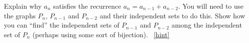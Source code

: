\documentclass{book}
\begin{document}
\setcounter{project}{133}
\addtocounter{project}{-1}
\begin{activity}[]\label{activity-126}
\hypertarget{p-929}{}%
Explain why \(a_n\) satisfies the recurrence \(a_n = a_{n-1} + a_{n-2}\).  You will need to use the graphs \(P_n\), \(P_{n-1}\) and \(P_{n-2}\) and their independent sets to do this.  Show how you can ``find'' the independent sets of \(P_{n-1}\) and \(P_{n-2}\) among the independent set of \(P_{n}\) (perhaps using some sort of bijection).%
~\hfill{\tiny\hyperlink{a-133}{[hint]}\hypertarget{q-133}{}}\end{activity}
\end{document}
